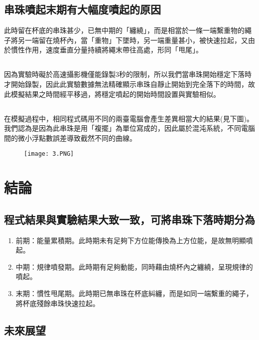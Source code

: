 \documentclass[11pt,twoside,b5paper]{article}
\begin{document}
\subsection{串珠噴起末期有大幅度噴起的原因}
此時留在杯底的串珠甚少，已無中期的「纏繞」，而是相當於一條一端繫重物的繩子將另一端留在燒杯內，當「重物」下墜時，另一端重量甚小，被快速拉起，又由於慣性作用，速度垂直分量持續將繩末帶往高處，形同「甩尾」。

\subsection{}
因為實驗時礙於高速攝影機僅能錄製3秒的限制，所以我們當串珠開始穩定下落時才開始錄製，因此此實驗數據無法精確顯示串珠自靜止開始到完全落下的時間，故此模擬結果之時間經平移過，將穩定噴起的開始時間設置與實驗相似。

\subsection{}
在模擬過程中，相同程式碼用不同的兩臺電腦會產生差異相當大的結果(見下圖)。我們認為是因為此串珠是用「複擺」為單位寫成的，因此屬於混沌系統，不同電腦間的微小浮點數誤差導致截然不同的曲線。

\begin{figure}[H]
    \centering
    \texttt{[image: 3.PNG]}
\end{figure}

\section{結論}

\subsection{程式結果與實驗結果大致一致，可將串珠下落時期分為}
\begin{enumerate}
    \item 前期：能量累積期。此時期未有足夠下方位能傳換為上方位能，是故無明顯噴起。 
    \item 中期：規律噴發期。此時期有足夠動能，同時藉由燒杯內之纏繞，呈現規律的噴起。
    \item 末期：慣性甩尾期。此時期已無串珠在杯底糾纏，而是如同一端繫重的繩子，將杯底殘餘串珠快速拉起。
\end{enumerate}

\subsection{未來展望}
\end{document}
